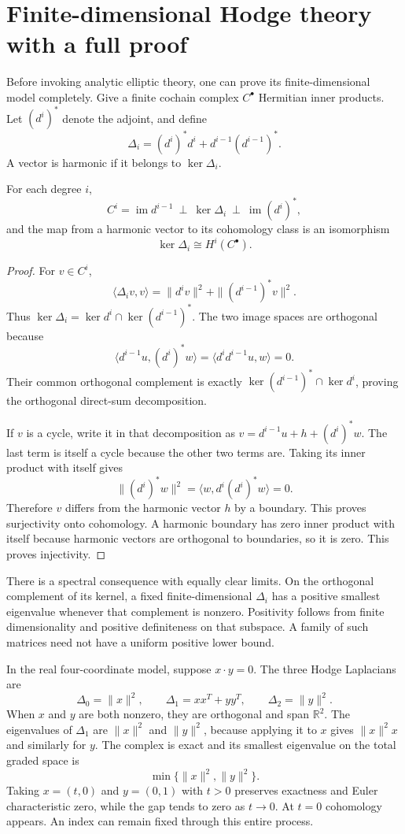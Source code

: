 \section{Finite-dimensional Hodge theory with a full proof}

Before invoking analytic elliptic theory, one can prove its finite-dimensional model completely. Give a finite cochain complex $C^\bullet$ Hermitian inner products. Let $(d^i)^*$ denote the adjoint, and define
\[
\Delta_i=(d^i)^*d^i+d^{i-1}(d^{i-1})^*.
\]
A vector is harmonic if it belongs to $\ker\Delta_i$.

\begin{theorem}
For each degree $i$,
\[
C^i=\operatorname{im}d^{i-1}\ \mathbin{\perp}\
\ker\Delta_i\ \mathbin{\perp}\ \operatorname{im}(d^i)^*,
\]
and the map from a harmonic vector to its cohomology class is an isomorphism
\[
\ker\Delta_i\cong H^i(C^\bullet).
\]
\end{theorem}
\begin{proof}
For $v\in C^i$,
\[
\langle\Delta_i v,v\rangle
=\|d^iv\|^2+\|(d^{i-1})^*v\|^2.
\]
Thus $\ker\Delta_i=\ker d^i\cap\ker(d^{i-1})^*$. The two image spaces are orthogonal because
\[
\langle d^{i-1}u,(d^i)^*w\rangle
=\langle d^id^{i-1}u,w\rangle=0.
\]
Their common orthogonal complement is exactly $\ker(d^{i-1})^*\cap\ker d^i$, proving the orthogonal direct-sum decomposition.

If $v$ is a cycle, write it in that decomposition as $v=d^{i-1}u+h+(d^i)^*w$. The last term is itself a cycle because the other two terms are. Taking its inner product with itself gives
\[
\|(d^i)^*w\|^2=\langle w,d^i(d^i)^*w\rangle=0.
\]
Therefore $v$ differs from the harmonic vector $h$ by a boundary. This proves surjectivity onto cohomology. A harmonic boundary has zero inner product with itself because harmonic vectors are orthogonal to boundaries, so it is zero. This proves injectivity.
\end{proof}

There is a spectral consequence with equally clear limits. On the orthogonal complement of its kernel, a fixed finite-dimensional $\Delta_i$ has a positive smallest eigenvalue whenever that complement is nonzero. Positivity follows from finite dimensionality and positive definiteness on that subspace. A family of such matrices need not have a uniform positive lower bound.

\begin{example}
In the real four-coordinate model, suppose $x\cdot y=0$. The three Hodge Laplacians are
\[
\Delta_0=\|x\|^2,
\qquad \Delta_1=xx^T+yy^T,
\qquad \Delta_2=\|y\|^2.
\]
When $x$ and $y$ are both nonzero, they are orthogonal and span $\mathbb R^2$. The eigenvalues of $\Delta_1$ are $\|x\|^2$ and $\|y\|^2$, because applying it to $x$ gives $\|x\|^2x$ and similarly for $y$. The complex is exact and its smallest eigenvalue on the total graded space is
\[
\min\{\|x\|^2,\|y\|^2\}.
\]
Taking $x=(t,0)$ and $y=(0,1)$ with $t>0$ preserves exactness and Euler characteristic zero, while the gap tends to zero as $t\to0$. At $t=0$ cohomology appears. An index can remain fixed through this entire process.
\end{example}

